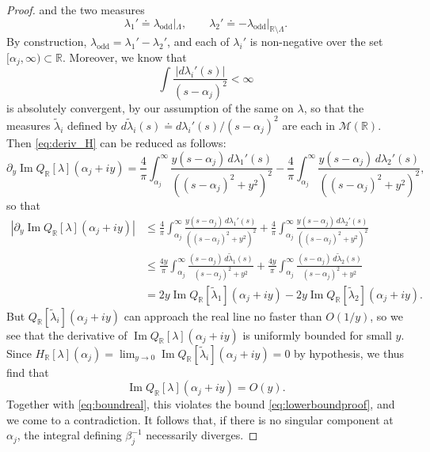 \documentclass{cams-l} %
\newcommand{\RR}{\mathbb R}
\newcommand{\cM}{\mathcal M}
\newcommand{\op}{\operatorname}
\renewcommand{\Im}{\op{Im}}
\theoremstyle{definition}
\theoremstyle{remark}
\numberwithin{equation}{section}
\begin{document}
\begin{proof}
    and the two measures
    \[\lambda_1'\doteq \lambda_\mathrm{odd}|_{\Lambda},\qquad \lambda_2'\doteq -\lambda_\mathrm{odd}|_{\RR\setminus\Lambda}.\]
    By construction, $\lambda_\mathrm{odd} = \lambda_1'-\lambda_2'$, and each of $\lambda_i'$ is non-negative over the set $[\alpha_j,\infty)\subset\RR$. Moreover, we know that
    \[\int\frac{|d\lambda_i'(s)|}{(s-\alpha_j)^2}<\infty\]
    is absolutely convergent, by our assumption of the same on $\lambda$, so that the measures $\widetilde{\lambda}_i$ defined by $d\widetilde{\lambda}_i(s) \doteq d\lambda_i'(s)/(s-\alpha_j)^2$ are each in $\cM(\RR)$. Then \cref{eq:deriv_H} can be reduced as follows:
    \[\partial_y\Im Q_{\RR}[\lambda](\alpha_j+iy) = \frac{4}{\pi}\int_{\alpha_j}^\infty \frac{y(s-\alpha_j)\,d\lambda_1'(s)}{((s-\alpha_j)^2+y^2)^2} - \frac{4}{\pi}\int_{\alpha_j}^\infty \frac{y(s-\alpha_j)\,d\lambda_2'(s)}{((s-\alpha_j)^2+y^2)^2},\]
    so that
    \begin{align*}\left|\partial_y\Im Q_{\RR}[\lambda](\alpha_j+iy)\right| &\leq \frac{4}{\pi}\int_{\alpha_j}^\infty \frac{y(s-\alpha_j)\,d\lambda_1'(s)}{((s-\alpha_j)^2+y^2)^2} + \frac{4}{\pi}\int_{\alpha_j}^\infty \frac{y(s-\alpha_j)\,d\lambda_2'(s)}{((s-\alpha_j)^2+y^2)^2}\\
    &\leq \frac{4y}{\pi}\int_{\alpha_j}^\infty \frac{(s-\alpha_j)\,d\widetilde{\lambda}_1(s)}{(s-\alpha_j)^2+y^2} + \frac{4y}{\pi}\int_{\alpha_j}^\infty \frac{(s-\alpha_j)\,d\widetilde{\lambda}_2(s)}{(s-\alpha_j)^2+y^2}\\
    &=2y\Im Q_{\RR}[\widetilde{\lambda}_1](\alpha_j+iy) - 2y\Im Q_{\RR}[\widetilde{\lambda}_2](\alpha_j+iy).
    \end{align*}
    But $Q_{\RR}[\widetilde{\lambda}_i](\alpha_j+iy)$ can approach the real line no faster than $O(1/y)$, so we see that the derivative of $\Im Q_{\RR}[\lambda](\alpha_j+iy)$ is uniformly bounded for small $y$. Since $H_\RR[\lambda](\alpha_j)=\lim_{y\to 0} \Im Q_\RR[\widetilde{\lambda}_i](\alpha_j+iy) = 0$ by hypothesis, we thus find that
    \[\Im Q_{\RR}[\lambda](\alpha_j+iy) = O(y).\]
    Together with \cref{eq:boundreal}, this violates the bound \cref{eq:lowerboundproof}, and we come to a contradiction. It follows that, if there is no singular component at $\alpha_j$, the integral defining $\beta_j^{-1}$ necessarily diverges.
\end{proof}
\end{document}
